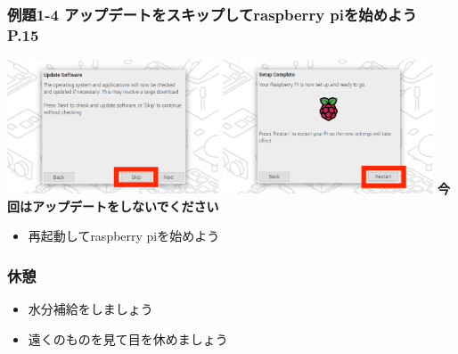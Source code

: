 \documentclass[dvipdfmx]{beamer}
\begin{document}
\begin{frame}[fragile]
	\frametitle{例題1-4 アップデートをスキップしてraspberry piを始めよう P.15~~~}
  \includegraphics[width=0.47\textwidth]{sw_image07.png}
  \hfill
  \includegraphics[width=0.47\textwidth]{sw_image08.png}
  \vfill
  \large\textbf{今回はアップデートをしないでください}
  \begin{itemize}
    \item 再起動してraspberry piを始めよう
  \end{itemize}

\end{frame}

\begin{frame}[fragile]
	\frametitle{休憩~~~}

	\huge
      \begin{itemize}
           \item 水分補給をしましょう
           \item 遠くのものを見て目を休めましょう
     \end{itemize}



\end{frame}
\end{document}
